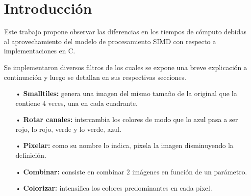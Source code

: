 \section{Introducción}
\par{Este trabajo propone observar las diferencias en los tiempos de cómputo debidas al aprovechamiento del modelo de procesamiento SIMD con respecto a implementaciones en C.}
\par{Se implementaron diversos filtros de los cuales se expone una breve explicación a continuación y luego se detallan en sus respectivas secciones.}
\begin{itemize}
\item[•] \textbf{Smalltiles:} genera una imagen del mismo tamaño de la original que la contiene 4 veces, una en cada cuadrante.
\item[•] \textbf{Rotar canales:} intercambia los colores de modo que lo azul pasa a ser rojo, lo rojo, verde y lo verde, azul.
\item[•] \textbf{Pixelar:} como su nombre lo indica, pixela la imagen disminuyendo la definición.
\item[•] \textbf{Combinar:} consiste en combinar 2 imágenes en función de un parámetro.
\item[•] \textbf{Colorizar:} intensifica los colores predominantes en cada píxel.
\end{itemize}

